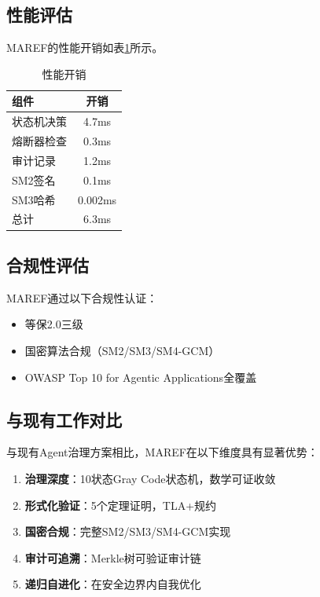 \subsection{性能评估}

MAREF的性能开销如表\ref{tab:performance}所示。

\begin{table}[htbp]
\caption{性能开销}
\label{tab:performance}
\begin{tabular}{lc}
\toprule
\textbf{组件} & \textbf{开销} \\
\midrule
状态机决策 & 4.7ms \\
熔断器检查 & 0.3ms \\
审计记录 & 1.2ms \\
SM2签名 & 0.1ms \\
SM3哈希 & 0.002ms \\
总计 & 6.3ms \\
\bottomrule
\end{tabular}
\end{table}

\subsection{合规性评估}

MAREF通过以下合规性认证：

\begin{itemize}
    \item 等保2.0三级
    \item 国密算法合规（SM2/SM3/SM4-GCM）
    \item OWASP Top 10 for Agentic Applications全覆盖
\end{itemize}

\subsection{与现有工作对比}

与现有Agent治理方案相比，MAREF在以下维度具有显著优势：

\begin{enumerate}
    \item \textbf{治理深度}：10状态Gray Code状态机，数学可证收敛
    \item \textbf{形式化验证}：5个定理证明，TLA+规约
    \item \textbf{国密合规}：完整SM2/SM3/SM4-GCM实现
    \item \textbf{审计可追溯}：Merkle树可验证审计链
    \item \textbf{递归自进化}：在安全边界内自我优化
\end{enumerate}

